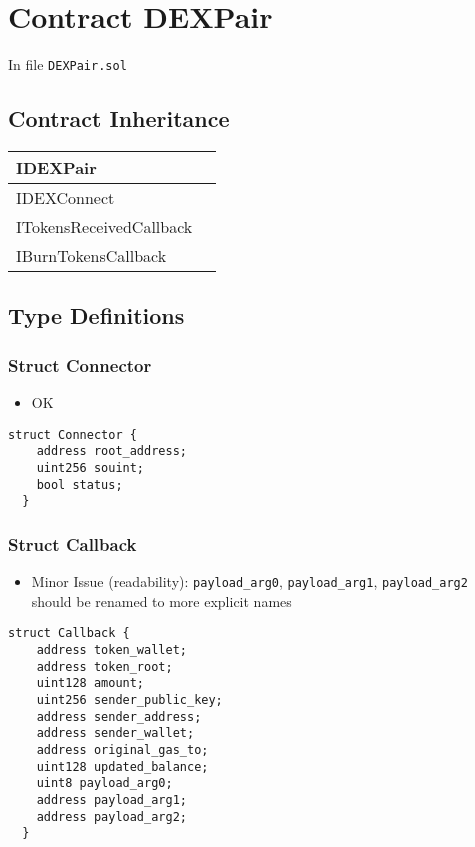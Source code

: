 
\chapter{Contract DEXPair}

\minitoc

In file {\tt DEXPair.sol}

\section{Contract Inheritance}


\noindent\begin{tabular}{|l|p{5cm}|}\hline
IDEXPair & \\\hline
IDEXConnect & \\\hline
ITokensReceivedCallback & \\\hline
IBurnTokensCallback & \\\hline
\end{tabular}


\section{Type Definitions}

\subsection{Struct Connector}

\begin{itemize}
\item OK
\end{itemize}

\begin{lstlisting}[firstnumber=37]
  struct Connector {
    address root_address;
    uint256 souint;
    bool status;
  }
\end{lstlisting}

\subsection{Struct Callback}

\begin{itemize}
\item Minor Issue (readability): {\tt payload\_arg0}, {\tt payload\_arg1},
  {\tt payload\_arg2} should be renamed to more explicit names
\end{itemize}

\begin{lstlisting}[firstnumber=48]
  struct Callback {
    address token_wallet;
    address token_root;
    uint128 amount;
    uint256 sender_public_key;
    address sender_address;
    address sender_wallet;
    address original_gas_to;
    uint128 updated_balance;
    uint8 payload_arg0;
    address payload_arg1;
    address payload_arg2;
  }
\end{lstlisting}

